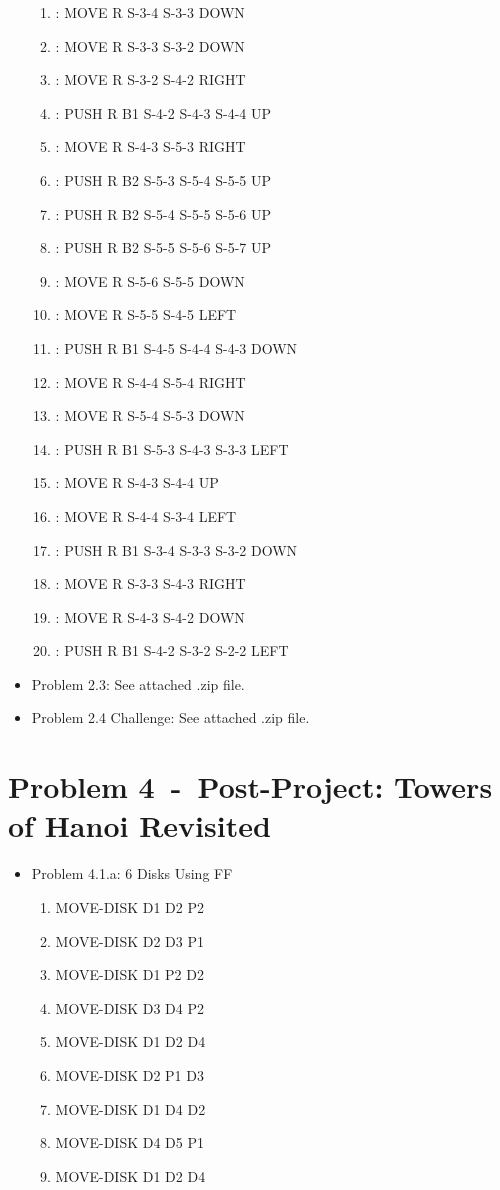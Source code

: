 \documentclass[12pt]{article}
\newcommand{\problem}[2]{\section*{Problem {#1}~-~{#2}}}
\begin{document}
\begin{appendix}
\begin{itemize}
\begin{enumerate}
	\item: MOVE R S-3-4 S-3-3 DOWN
	\item: MOVE R S-3-3 S-3-2 DOWN
	\item: MOVE R S-3-2 S-4-2 RIGHT
	\item: PUSH R B1 S-4-2 S-4-3 S-4-4 UP
	\item: MOVE R S-4-3 S-5-3 RIGHT
	\item: PUSH R B2 S-5-3 S-5-4 S-5-5 UP
	\item: PUSH R B2 S-5-4 S-5-5 S-5-6 UP
	\item: PUSH R B2 S-5-5 S-5-6 S-5-7 UP
	\item: MOVE R S-5-6 S-5-5 DOWN
	\item: MOVE R S-5-5 S-4-5 LEFT
	\item: PUSH R B1 S-4-5 S-4-4 S-4-3 DOWN
	\item: MOVE R S-4-4 S-5-4 RIGHT
	\item: MOVE R S-5-4 S-5-3 DOWN
	\item: PUSH R B1 S-5-3 S-4-3 S-3-3 LEFT
	\item: MOVE R S-4-3 S-4-4 UP
	\item: MOVE R S-4-4 S-3-4 LEFT
	\item: PUSH R B1 S-3-4 S-3-3 S-3-2 DOWN
	\item: MOVE R S-3-3 S-4-3 RIGHT
	\item: MOVE R S-4-3 S-4-2 DOWN
	\item: PUSH R B1 S-4-2 S-3-2 S-2-2 LEFT
      \end{enumerate}
    \item Problem 2.3: See attached .zip file.
    \item Problem 2.4 Challenge: See attached .zip file.
  \end{itemize}
\problem{4}{Post-Project: Towers of Hanoi Revisited}
  \begin{itemize}
    \item Problem 4.1.a: 6 Disks Using FF
	\begin{enumerate}
	\item  MOVE-DISK D1 D2 P2
	\item  MOVE-DISK D2 D3 P1
	\item  MOVE-DISK D1 P2 D2
	\item  MOVE-DISK D3 D4 P2
	\item  MOVE-DISK D1 D2 D4
	\item  MOVE-DISK D2 P1 D3
	\item  MOVE-DISK D1 D4 D2
	\item  MOVE-DISK D4 D5 P1
	\item  MOVE-DISK D1 D2 D4

\end{enumerate}
\end{itemize}
\end{appendix}
\end{document}
